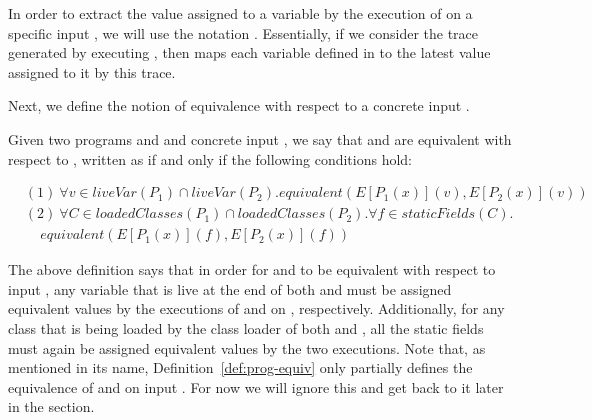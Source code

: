 \documentclass[runningheads,a4paper]{llncs}
\begin{document}
In order to extract the value assigned to a variable  by the execution of  on a specific input ,
we will use the notation . Essentially, if we consider the trace generated by executing ,
then  maps each variable defined in  to the latest value assigned to it by this trace.


Next, we define the notion of equivalence with respect to a concrete input .

\begin{definition}\label{def:prog-equiv}
  Given two programs  and  and concrete input ,
  we say that  and  are equivalent
  with respect to , written as 
  if and only if the following conditions hold:

\[
    \begin{aligned}
      & (1)~ \forall v\in liveVar(P_1)\cap liveVar(P_2). equivalent(E[P_1(x)](v), E[P_2(x)](v))\\
& (2)~  \forall C \in loadedClasses(P_1) \cap loadedClasses(P_2).\forall f \in staticFields(C).\\
  &  ~~~~~ equivalent(E[P_1(x)](f), E[P_2(x)](f))
    \end{aligned}
    \]
   
  \end{definition}

The above definition says that in order for  and
 to be equivalent with respect to input , any variable
that is live at the end of both  and  must be
assigned equivalent values by the executions of  and
 on , respectively.
Additionally, for any class that
is being loaded by the class loader of both  and ,
all the static fields must again be assigned equivalent values by the
two executions. %
Note that, as mentioned in its name, Definition~\ref{def:prog-equiv} only partially
defines the equivalence of  and  on input . For now
we will ignore this and get back to it later in the section.
\end{document}
